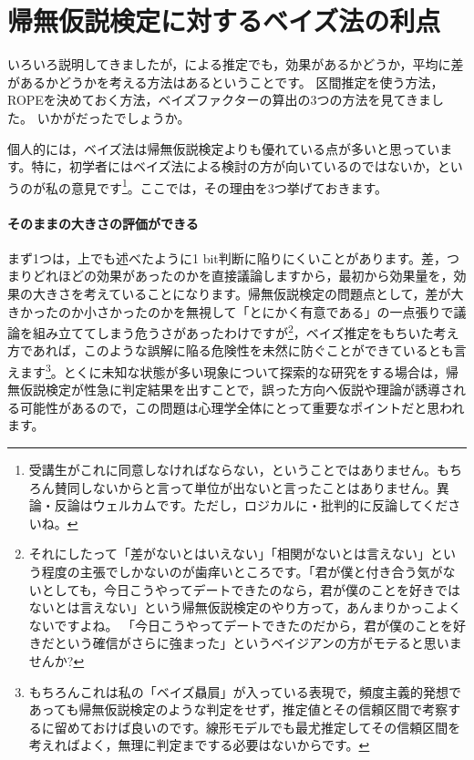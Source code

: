 \documentclass{ltjbook}
\begin{document}
\section{帰無仮説検定に対するベイズ法の利点}

いろいろ説明してきましたが，による推定でも，効果があるかどうか，平均に差があるかどうかを考える方法はあるということです。
区間推定を使う方法，ROPEを決めておく方法，ベイズファクターの算出の3つの方法を見てきました。
いかがだったでしょうか。

個人的には，ベイズ法は帰無仮説検定よりも優れている点が多いと思っています。特に，初学者にはベイズ法による検討の方が向いているのではないか，というのが私の意見です\footnote{受講生がこれに同意しなければならない，ということではありません。もちろん賛同しないからと言って単位が出ないと言ったことはありません。異論・反論はウェルカムです。ただし，ロジカルに・批判的に反論してくださいね。}。ここでは，その理由を3つ挙げておきます。


\paragraph{そのままの大きさの評価ができる}
まず1つは，上でも述べたように1 bit判断に陥りにくいことがあります。差，つまりどれほどの効果があったのかを直接議論しますから，最初から効果量を，効果の大きさを考えていることになります。帰無仮説検定の問題点として，差が大きかったのか小さかったのかを無視して「とにかく有意である」の一点張りで議論を組み立ててしまう危うさがあったわけですが\footnote{それにしたって「差がないとはいえない」「相関がないとは言えない」という程度の主張でしかないのが歯痒いところです。「君が僕と付き合う気がないとしても，今日こうやってデートできたのなら，君が僕のことを好きではないとは言えない」という帰無仮説検定のやり方って，あんまりかっこよくないですよね。 「今日こうやってデートできたのだから，君が僕のことを好きだという確信がさらに強まった」というベイジアンの方がモテると思いませんか? }，ベイズ推定をもちいた考え方であれば，このような誤解に陥る危険性を未然に防ぐことができているとも言えます\footnote{もちろんこれは私の「ベイズ贔屓」が入っている表現で，頻度主義的発想であっても帰無仮説検定のような判定をせず，推定値とその信頼区間で考察するに留めておけば良いのです。線形モデルでも最尤推定してその信頼区間を考えればよく，無理に判定までする必要はないからです。}。とくに未知な状態が多い現象について探索的な研究をする場合は，帰無仮説検定が性急に判定結果を出すことで，誤った方向へ仮説や理論が誘導される可能性があるので，この問題は心理学全体にとって重要なポイントだと思われます。
\end{document}
